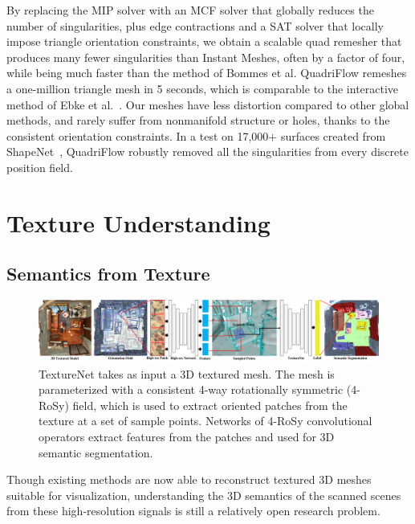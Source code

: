 By replacing the MIP solver with an MCF solver that globally reduces the number of singularities, plus edge contractions and a SAT solver that locally impose triangle orientation constraints, we obtain a scalable quad remesher that produces many fewer singularities than Instant Meshes, often by a factor of four, while being much faster than the method of Bommes et al. QuadriFlow remeshes a one-million triangle mesh in 5 seconds, which is comparable to the interactive method of Ebke et al.~\cite{ebke2016interactively}. Our meshes have less distortion compared to other global methods, and rarely suffer from nonmanifold structure or holes, thanks to the consistent orientation constraints. In a test on 17,000$+$ surfaces created from ShapeNet~\cite{chang2015shapenet}, %
QuadriFlow robustly removed all the singularities from every discrete position field.


\section{Texture Understanding}
\subsection{Semantics from Texture}
\begin{figure}
	\begin{center}
		\includegraphics[width=\linewidth]{texturenet/teaser/teaser.pdf}
		\caption{TextureNet takes as input a 3D textured mesh.  The mesh is parameterized with a consistent 4-way rotationally symmetric (4-RoSy) field, which is used to extract oriented patches from the texture at a set of sample points.   Networks of 4-RoSy convolutional operators extract features from the patches and used for 3D semantic segmentation.}
		\label{fig:texturenet-teaser}
	\end{center}    
\end{figure}
\label{intro:texture-learn}
Though existing methods are now able to reconstruct textured 3D meshes suitable for visualization, understanding the 3D semantics of the scanned scenes from these high-resolution signals is still a relatively open research problem. 

